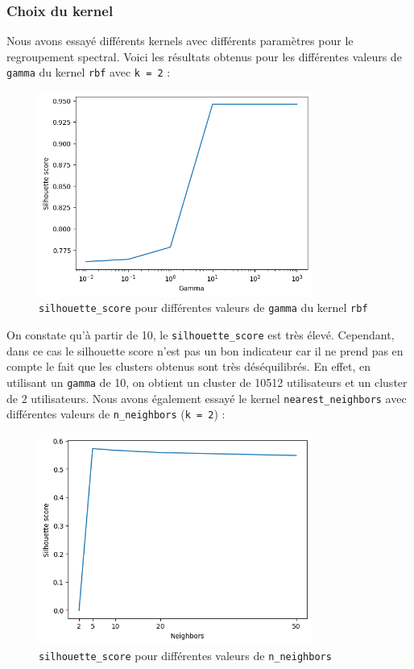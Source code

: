 \documentclass{article}
\begin{document}
\subsubsection{Choix du kernel}
Nous avons essayé différents kernels avec différents paramètres pour le regroupement spectral.
\vskip 0.25cm
\noindent Voici les résultats obtenus pour les différentes valeurs de \texttt{gamma} du
kernel \texttt{rbf} avec \texttt{k = 2} :

\begin{figure}[ht]
  \centering
  \includegraphics[width=0.8\textwidth]{img/silhouette_graph_gamma.png}
  \caption{\texttt{silhouette\_score} pour différentes valeurs de \texttt{gamma} du kernel \texttt{rbf}}
\end{figure}

On constate qu'à partir de 10, le \texttt{silhouette\_score} est très élevé.
Cependant, dans ce cas le silhouette score n'est pas un bon indicateur car il
ne prend pas en compte le fait que les clusters obtenus sont très déséquilibrés.
En effet, en utilisant un \texttt{gamma} de 10, on obtient un cluster de 10512 
utilisateurs et un cluster de 2 utilisateurs.
\newpage
Nous avons également essayé le kernel \texttt{nearest\_neighbors} avec différentes
valeurs de \texttt{n\_neighbors} (\texttt{k = 2}) :

\begin{figure}[ht]
    \centering
    \includegraphics[width=0.8\textwidth]{img/silhouette_graph_neighbors.png}
    \caption{\texttt{silhouette\_score} pour différentes valeurs de \texttt{n\_neighbors}}
  \end{figure}
\end{document}
